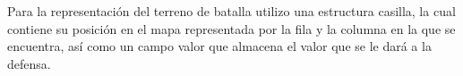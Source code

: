 Para la representación del terreno de batalla utilizo una estructura casilla, la cual contiene su posición en el mapa
representada por la fila y la columna en la que se encuentra, así como un campo valor que almacena el valor que se le dará a la defensa.